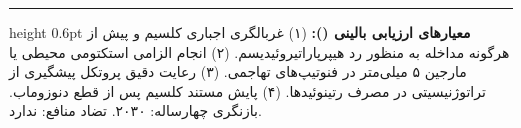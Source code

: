 \documentclass[a4paper]{article}
\begin{document}
\vspace{5pt}
\hrule height 0.6pt\vspace{3pt}
\footnotesize\textbf{معیارهای ارزیابی بالینی ():} (۱) غربالگری اجباری کلسیم و  پیش از هرگونه مداخله به منظور رد هیپرپاراتیروئیدیسم. (۲) انجام الزامی استکتومی محیطی یا مارجین ۵ میلی‌متر در فنوتیپ‌های تهاجمی. (۳) رعایت دقیق پروتکل پیشگیری از تراتوژنیسیتی در مصرف رتینوئیدها. (۴) پایش مستند کلسیم پس از قطع دنوزوماب. بازنگری چهارساله: ۲۰۳۰. تضاد منافع: ندارد.
\end{document}
